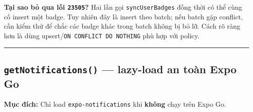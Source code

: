 \documentclass[12pt,a4paper]{article}
\newenvironment{Shaded}{%
  \VerbatimEnvironment
  \begin{quote}\small\ttfamily
}{%
  \end{quote}%
}
\begin{document}
\textbf{Tại sao bỏ qua lỗi \texttt{23505}?} Hai lần gọi
\texttt{syncUserBadges} đồng thời có thể cùng cố insert một badge. Tuy
nhiên đây là insert theo batch; nếu batch gặp conflict, cần kiểm thử để
chắc các badge khác trong batch không bị bỏ lỡ. Cách rõ ràng hơn là dùng
upsert/\texttt{ON\ CONFLICT\ DO\ NOTHING} phù hợp với policy.

\begin{center}\rule{0.5\linewidth}{0.5pt}\end{center}

\subsection{\texorpdfstring{\texttt{getNotifications()} --- lazy-load an
toàn Expo
Go}{getNotifications() --- lazy-load an toàn Expo Go}}\label{getnotifications-lazy-load-an-touxe0n-expo-go}

\textbf{Mục đích:} Chỉ load \texttt{expo-notifications} khi
\textbf{không} chạy trên Expo Go.

\begin{Shaded}
\begin{Highlighting}[]
\OperatorTok{=} \OperatorTok{===}\OperatorTok{;}

  \NormalTok{()}\OperatorTok{:} \OperatorTok{\textless{}}\OperatorTok{|} \OperatorTok{\textgreater{}}\NormalTok{ \{}
   \OperatorTok{;}  

  \OperatorTok{===} \NormalTok{) \{}
    \NormalTok{ \{}
\OperatorTok{=}  \NormalTok{(}\NormalTok{)}\OperatorTok{;}  
\NormalTok{(\{ }\NormalTok{ \})}\OperatorTok{;}
\NormalTok{    \} }\NormalTok{ \{}
\OperatorTok{=} \OperatorTok{;}
\NormalTok{    \}}
\NormalTok{  \}}
  \OperatorTok{;}
\NormalTok{\}}

\end{Highlighting}
\end{Shaded}
\end{document}
